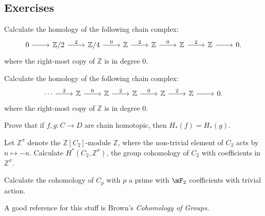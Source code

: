 \subsection{Exercises}

\begin{exercise}{}{}
    Calculate the homology of the following chain complex:
    \[ \begin{tikzcd} 
     0 \ar[r] & \mathbb{Z}/2  \ar[r,"2"] & \mathbb{Z}/4 \ar[r,"0"] & \mathbb{Z} \ar[r,"2"] & \mathbb{Z} \ar[r,"0"] & \mathbb{Z} \ar[r,"2"] & \mathbb{Z} \ar[r] & 0.
    \end{tikzcd} \]
    where the right-most copy of $\mathbb{Z}$ is in degree $0$. 
\end{exercise}
\begin{exercise}{}{}
    Calculate the homology of the following chain complex:
    \[ \begin{tikzcd} 
    \cdots \ar[r,"2"] & \mathbb{Z} \ar[r,"0"] & \mathbb{Z} \ar[r,"2"] & \mathbb{Z} \ar[r,"0"] & \mathbb{Z} \ar[r,"2"] & \mathbb{Z} \ar[r] & 0.
    \end{tikzcd} \]
    where the right-most copy of $\mathbb{Z}$ is in degree $0$. 
\end{exercise}
\begin{exercise}{}{}
    Prove that if $f,g:C \to D$ are chain homotopic, then $H_*(f) = H_*(g)$.
\end{exercise}
\begin{exercise}{}{}
    Let $\mathbb{Z}^\sigma$ denote the $\mathbb{Z}[C_2]$-module $\mathbb{Z}$, where the non-trivial element of $C_2$ acts by $n \mapsto -n$. Calculate $H^*(C_2,\mathbb{Z}^\sigma)$, the group cohomology of $C_2$ with coefficients in $\mathbb{Z}^\sigma$.

\end{exercise}
\begin{exercise}{}
    Calculate the cohomology of $C_p$ with $p$ a prime with $\mF_2$ coefficients with trivial action. 

    A good reference for this stuff is Brown's \emph{Cohomology of Groups. }
\end{exercise}